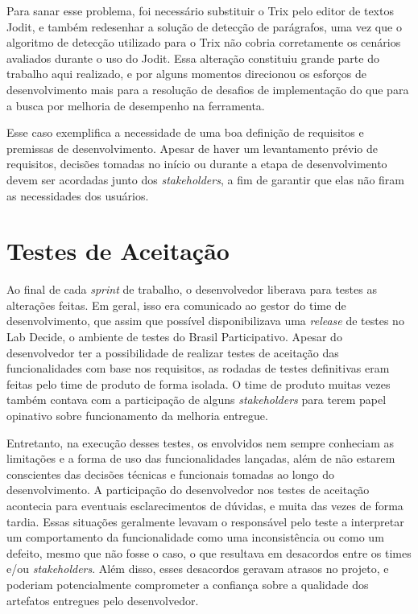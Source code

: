 Para sanar esse problema, foi necessário substituir o Trix pelo editor de textos Jodit, e também redesenhar a solução de detecção de parágrafos, uma vez que o algoritmo de detecção utilizado para o Trix não cobria corretamente os cenários avaliados durante o uso do Jodit.
Essa alteração constituiu grande parte do trabalho aqui realizado, e por alguns momentos direcionou os esforços de desenvolvimento mais para a resolução de desafios de implementação do que para a busca por melhoria de desempenho na ferramenta.

Esse caso exemplifica a necessidade de uma boa definição de requisitos e premissas de desenvolvimento.
Apesar de haver um levantamento prévio de requisitos, decisões tomadas no início ou durante a etapa de desenvolvimento devem ser acordadas junto dos \textit{stakeholders}, a fim de garantir que elas não firam as necessidades dos usuários.

\section {Testes de Aceitação}
\label{sec:testes-de-aceitacao}

Ao final de cada \textit{sprint} de trabalho, o desenvolvedor liberava para testes as alterações feitas.
Em geral, isso era comunicado ao gestor do time de desenvolvimento, que assim que possível disponibilizava uma \textit{release} de testes no Lab Decide, o ambiente de testes do Brasil Participativo.
Apesar do desenvolvedor ter a possibilidade de realizar testes de aceitação das funcionalidades com base nos requisitos, as rodadas de testes definitivas eram feitas pelo time de produto de forma isolada.
O time de produto muitas vezes também contava com a participação de alguns \textit{stakeholders} para terem papel opinativo sobre funcionamento da melhoria entregue.

Entretanto, na execução desses testes, os envolvidos nem sempre conheciam as limitações e a forma de uso das funcionalidades lançadas, além de não estarem conscientes das decisões técnicas e funcionais tomadas ao longo do desenvolvimento.
A participação do desenvolvedor nos testes de aceitação acontecia para eventuais esclarecimentos de dúvidas, e muita das vezes de forma tardia.
Essas situações geralmente levavam o responsável pelo teste a interpretar um comportamento da funcionalidade como uma inconsistência ou como um defeito, mesmo que não fosse o caso, o que resultava em desacordos entre os times e/ou \textit{stakeholders}.
Além disso, esses desacordos geravam atrasos no projeto, e poderiam potencialmente comprometer a confiança sobre a qualidade dos artefatos entregues pelo desenvolvedor.

